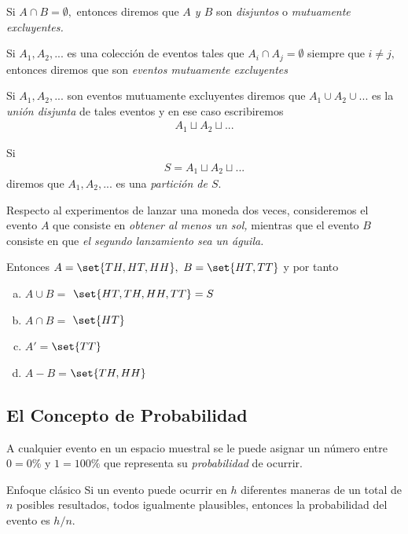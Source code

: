 {}
 Si $A\cap B= \emptyset,$ entonces diremos que \emph{$A$ y $B$} son \emph{disjuntos} o \emph{mutuamente excluyentes.} 

 \begin{defn}
  Si $A_{1},A_{2},...$ es una colección de eventos tales que $A_{i}\cap A_{j}=\emptyset$ siempre que $i\neq j,$ entonces diremos que son \emph{eventos mutuamente excluyentes}
 \end{defn}

 


 \begin{defn}
  Si $A_{1}, A_{2}, ...$ son eventos mutuamente excluyentes diremos que $A_{1} \cup A_{2} \cup ... $ es la \emph{unión disjunta} de tales eventos y en ese caso escribiremos
  \begin{align*}
A_{1}\sqcup A_{2} \sqcup ...
\end{align*}
 \end{defn}


Si \begin{align*}
S=A_{1}\sqcup A_{2} \sqcup ...
\end{align*}
diremos que $A_{1},A_{2},...$ es una \emph{partición de $S.$}


 \begin{ejemplo}
  \label{exmp:1.9}
  Respecto al experimentos de lanzar una moneda dos veces, consideremos el evento $A$ que consiste en \emph{obtener al menos un sol,}  mientras que el evento $B$ consiste en que \emph{el segundo lanzamiento sea un águila.}

  Entonces $A=\set{TH,HT,HH},$ $B=\set{HT,TT}$ y por tanto 
  \begin{enumerate}[(a)]
   \item $A\cup B =$ $\set{HT,TH,HH,TT}= S$ 
	\item $A\cap B =$ $\set{HT}$ 
	\item $A'=$$\set{TT}$
	\item $A-B=$$\set{TH,HH}$
  \end{enumerate}

 \end{ejemplo}


\subsection{El Concepto de Probabilidad}
{}
A cualquier evento en un espacio muestral se le puede asignar un número entre $0=0\%$ y $1=100\%$ que representa su \emph{probabilidad} de ocurrir.

{Enfoque clásico}
Si un evento puede ocurrir en $h$ diferentes maneras de un total de $n$ posibles resultados, todos igualmente plausibles, entonces la probabilidad del evento es $h/n.$


